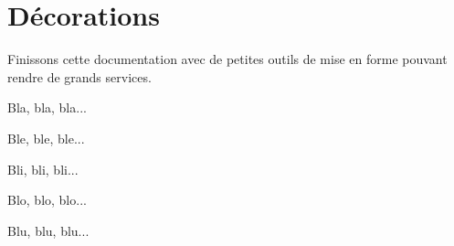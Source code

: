 \documentclass[10pt, a4paper]{article}
\begin{document}
\section{Décorations}

Finissons cette documentation avec de petites outils de mise en forme pouvant rendre de grands services.

\begin{tdoclatex}[sbs]
Bla, bla, bla...

\tdocsep %

Ble, ble, ble...

Bli, bli, bli...

\tdocxspace %

Blo, blo, blo...

Blu, blu, blu...

\end{tdoclatex}
\end{document}
